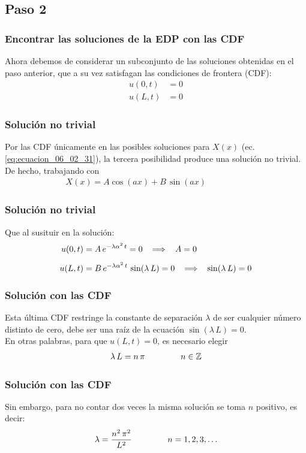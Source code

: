 \documentclass[12pt]{beamer}
\begin{document}
\subsection{Paso 2}
\begin{frame}
\frametitle{Encontrar las soluciones de la EDP con las CDF}
Ahora debemos de considerar un subconjunto de las soluciones obtenidas en el paso anterior, que a su vez satisfagan las condiciones de frontera (CDF):
\begin{align*}
u(0, t) &= 0 \\[0.5em]
u(L, t) &= 0
\end{align*}
\end{frame}
\begin{frame}
\frametitle{Solución no trivial}
Por las CDF únicamente en las posibles soluciones para $X(x)$ (ec. \ref{eq:ecuacion_06_02_31}), la tercera posibilidad produce una solución no trivial. De hecho, trabajando con
\begin{align*}
X(x) = A \cos (a x) + B \, \sin (a x) \hspace{2cm}
\end{align*}
\end{frame}
\begin{frame}
\frametitle{Solución no trivial}
Que al susituir en la solución:
\begin{align*}
u(0, t) &= A \, e^{-\lambda \alpha^{2} \, t} = 0 \hspace{0.3cm} \Longrightarrow \hspace{0.3cm} A = 0 \\[0.5em]
u(L, t) &= B \, e^{-\lambda \alpha^{2} \, t} \, \sin (\lambda \, L) = 0 \hspace{0.3cm} \Longrightarrow \hspace{0.3cm} \sin (\lambda \, L) = 0
\end{align*}
\end{frame}
\begin{frame}
\frametitle{Solución con las CDF}
Esta última CDF restringe la constante de separación $\lambda$ de ser cualquier número distinto de cero, debe ser una raíz de la ecuación $\sin (\lambda \, L) = 0$.
\\
\bigskip
En otras palabras, para que $u(L, t) = 0$, es necesario elegir
\begin{align}
\lambda \, L = n \, \pi \hspace{1.5cm} n \in \mathbb{Z}
\label{eq:ecuacion_06_02_34}    
\end{align}
\end{frame}
\begin{frame}
\frametitle{Solución con las CDF}
Sin embargo, para no contar dos veces la misma solución se toma $n$ positivo, es decir:
\begin{align}
\lambda = \dfrac{n^{2} \, \pi^{2}}{L^{2}} \hspace{1.5cm} n = 1, 2, 3, \ldots
\label{eq:ecuacion_06_02_35}
\end{align}
\end{frame}
\end{document}
